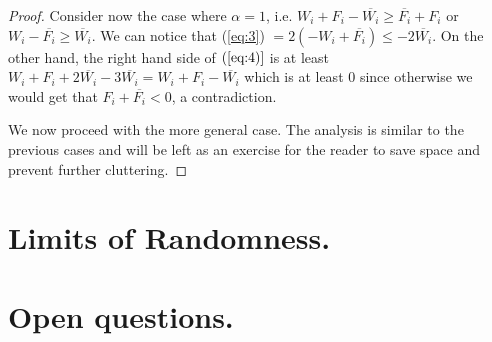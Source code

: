 \documentclass[11pt,letter]{article}
\begin{document}
\begin{proof}
Consider now the case where $\alpha = 1$, i.e. $W_i + F_i -\overline{W_i} \geq \overline{F_i} + F_i$ or $W_i - \overline{F_i} \geq \overline{W_i}$.
We can notice that (\ref{eq:3}) $= 2(-W_i + \overline{F_i}) \leq -2\overline{W_i}$. On the other hand, the right hand side of  $(\ref{eq:4)}$
is at least $W_i + F_i + 2\overline{W_i} -3\overline{W_i} = W_i + F_i - \overline{W_i}$ which is at least $0$ since otherwise we would get
that $F_i + \overline{F_i} < 0$, a contradiction.

We now proceed with the more general case. The analysis is similar to the previous cases and will be left as an exercise
for the reader to save space and prevent further cluttering.

\end{proof}

\section{Limits of Randomness.}
\section{Open questions.}



\end{document}
